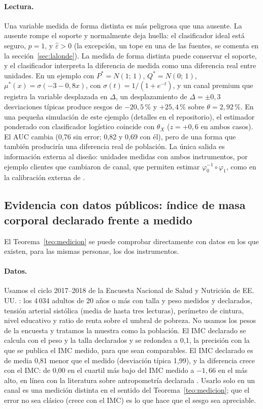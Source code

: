 \paragraph{Lectura.} Una variable medida de forma distinta es más peligrosa que una ausente. La ausente rompe el soporte y normalmente deja huella: el clasificador ideal está seguro, $p=1$, y $\hat\varepsilon>0$ (la excepción, un tope en una de las fuentes, se comenta en la sección~\ref{sec:lalonde}). La medida de forma distinta puede conservar el soporte, y el clasificador interpreta la diferencia de medida como una diferencia real entre unidades. En un ejemplo con $P^*=N(1;\,1)$, $Q^*=N(0;\,1)$, $\mu^*(x)=\sigma(-3-0,8x)$, con $\sigma(t)=1/(1+e^{-t})$, y un canal premium que registra la variable desplazada en $\Delta$, un desplazamiento de $\Delta=\pm0,3$ desviaciones típicas produce sesgos de $-20,5\,\%$ y $+25,4\,\%$ sobre $\theta=2,92\,\%$. En una pequeña simulación de este ejemplo (detalles en el repositorio), el estimador ponderado con clasificador logístico coincide con $\theta_X$ ($z=+0,6$ en ambos casos). El AUC cambia (0,76 sin error; 0,82 y 0,69 con él), pero de una forma que también produciría una diferencia real de población. La única salida es información externa al diseño: unidades medidas con ambos instrumentos, por ejemplo clientes que cambiaron de canal, que permiten estimar $\varphi_0^{-1}\circ\varphi_1$, como en la calibración externa de \citet{webbvargas2017}.

\subsection{Evidencia con datos públicos: índice de masa corporal declarado frente a medido}\label{sec:nhanes}

El Teorema~\ref{teo:medicion} se puede comprobar directamente con datos en los que existen, para las mismas personas, los dos instrumentos.

\paragraph{Datos.} Usamos el ciclo 2017--2018 de la Encuesta Nacional de Salud y Nutrición de EE.\,UU. \citep{nchs2020}: los 4\,034 adultos de 20 años o más con talla y peso medidos y declarados, tensión arterial sistólica (media de hasta tres lecturas), perímetro de cintura, nivel educativo y ratio de renta sobre el umbral de pobreza. No usamos los pesos de la encuesta y tratamos la muestra como la población. El IMC declarado se calcula con el peso y la talla declarados y se redondea a 0,1, la precisión con la que se publica el IMC medido, para que sean comparables. El IMC declarado es de media 0,81 menor que el medido (desviación típica 1,99), y la diferencia crece con el IMC: de 0,00 en el cuartil más bajo del IMC medido a $-1,66$ en el más alto, en línea con la literatura sobre antropometría declarada \citep{connorgorber2007}. Usarlo solo en un canal es una medición distinta en el sentido del Teorema~\ref{teo:medicion}; que el error no sea clásico (crece con el IMC) es lo que hace que el sesgo sea apreciable.

